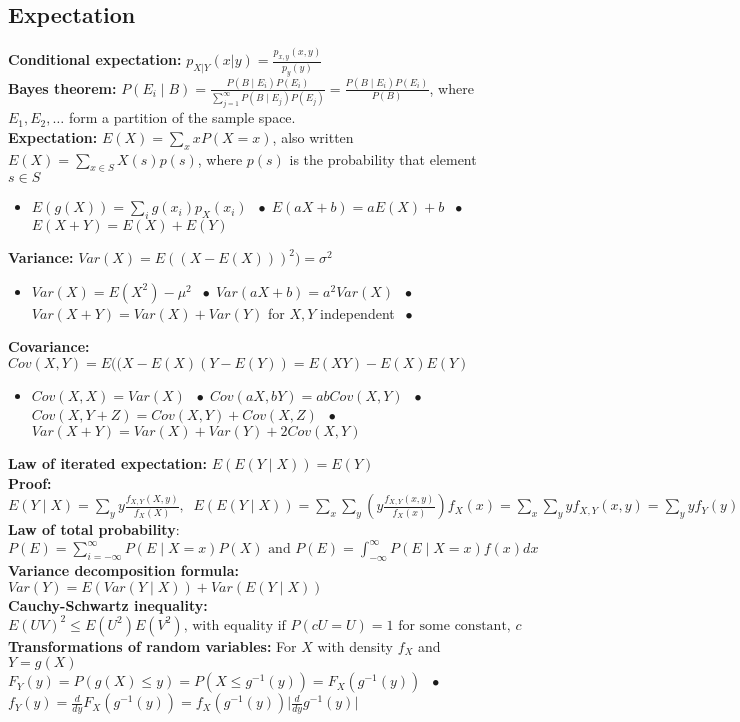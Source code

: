 \documentclass{article}
\newcommand{\abs}[1]{\lvert#1\rvert}
\newcommand*\bspace{$\; \bullet \;$}
\begin{document}
\subsection{Expectation}
\textbf{Conditional expectation: } $p_{X|Y}(x|y) = \frac{p_{x,y}(x,y)}{p_y(y)}$\\
\textbf{Bayes theorem: } $P(E_i \mid B) = \frac{P(B \mid E_i)P(E_i)}{\sum_{j=1}^\infty P(B \mid E_j)P(E_j)} = \frac{P(B \mid E_i)P(E_i)}{P(B)}$, where $E_1, E_2, \dots$ form a partition of the sample space.\\
\textbf{Expectation: } $E(X) = \sum_x xP(X=x)$, also written $E(X) = \sum_{x \in S} X(s)p(s)$, where $p(s)$ is the probability that element $s \in S$
\begin{itemize}
    \item $E(g(X)) = \sum_i g(x_i)p_X(x_i)$ \bspace $E(aX + b) = aE(X) + b$ \bspace $E(X + Y) = E(X) + E(Y)$
\end{itemize}
\textbf{Variance: } $Var(X) = E((X - E(X)))^2) = \sigma^2$
\begin{itemize}
    \item $Var(X) = E(X^2) - \mu^2$ \bspace $Var(aX+b) = a^2Var(X)$ \bspace $Var(X + Y) = Var(X) + Var(Y)$ for $X,Y$ independent \bspace 
\end{itemize}
\textbf{Covariance: } $Cov(X, Y) = E((X - E(X)(Y - E(Y)) = E(XY) - E(X)E(Y)$
\begin{itemize}
    \item $Cov(X, X) = Var(X)$ \bspace $Cov(aX, bY) = abCov(X, Y)$ \bspace $Cov(X, Y+Z) = Cov(X, Y) + Cov(X, Z)$ \bspace $Var(X + Y) = Var(X) + Var(Y) + 2Cov(X, Y)$
\end{itemize}
\textbf{Law of iterated expectation: } $E(E(Y\mid X)) = E(Y)$\\
\textbf{Proof: }$E(Y\mid X) = \sum_y y\frac{f_{X, Y}(X, y)}{f_X(X)}, \; \; E(E(Y\mid X)) = \sum_x \sum_y \left ( y\frac{f_{X, Y}(x, y)}{f_X(x)} \right ) f_X(x) = \sum_x \sum_y y f_{X, Y}(x, y) = \sum_y y f_{Y}(y) = E(Y)$\\
\textbf{Law of total probability}: $P(E) = \sum_{i=-\infty}^\infty P(E \mid X = x)P(X) \textrm{ and } P(E) = \int_{-\infty}^\infty P(E \mid X=x)f(x)dx$\\
\textbf{Variance decomposition formula: } $Var(Y) = E(Var(Y\mid X)) + Var(E(Y \mid X))$\\
\textbf{Cauchy-Schwartz inequality: }$E(UV)^2 \leq E(U^2)E(V^2) \textrm{, with equality if } P(cU=U) = 1 \textrm{ for some constant, } c$\\
\textbf{Transformations of random variables: } For $X$ with density $f_X$ and $Y = g(X)$\\
$F_Y(y) = P(g(X)\leq y) = P(X \leq g^{-1}(y)) = F_X(g^{-1}(y))$ \bspace $f_Y(y) = \frac{d}{dy}F_X(g^{-1}(y)) = f_X(g^{-1}(y))\abs{\frac{d}{dy}g^{-1}(y)}$
 
\end{document}
